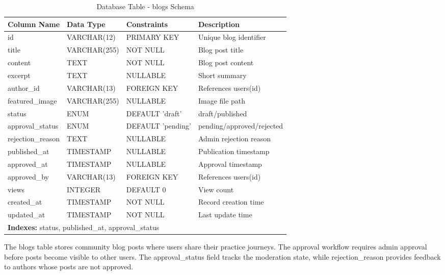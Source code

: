 \documentclass[12pt,a4paper]{report}
\newcommand{\JustifiedNormal}{\fontsize{12}{14}\selectfont\justifying\setlength{\parindent}{0pt}}
\begin{document}
\begin{table}[H]
\centering
\caption{Database Table - blogs Schema}
\small
\begin{tabular}{|p{3.5cm}|p{2.5cm}|p{3.5cm}|p{4cm}|}
\hline
\textbf{Column Name} & \textbf{Data Type} & \textbf{Constraints} & \textbf{Description} \\
\hline
id & VARCHAR(12) & PRIMARY KEY & Unique blog identifier \\
\hline
title & VARCHAR(255) & NOT NULL & Blog post title \\
\hline
content & TEXT & NOT NULL & Blog post content \\
\hline
excerpt & TEXT & NULLABLE & Short summary \\
\hline
author\_id & VARCHAR(13) & FOREIGN KEY & References users(id) \\
\hline
featured\_image & VARCHAR(255) & NULLABLE & Image file path \\
\hline
status & ENUM & DEFAULT 'draft' & draft/published \\
\hline
approval\_status & ENUM & DEFAULT 'pending' & pending/approved/rejected \\
\hline
rejection\_reason & TEXT & NULLABLE & Admin rejection reason \\
\hline
published\_at & TIMESTAMP & NULLABLE & Publication timestamp \\
\hline
approved\_at & TIMESTAMP & NULLABLE & Approval timestamp \\
\hline
approved\_by & VARCHAR(13) & FOREIGN KEY & References users(id) \\
\hline
views & INTEGER & DEFAULT 0 & View count \\
\hline
created\_at & TIMESTAMP & NOT NULL & Record creation time \\
\hline
updated\_at & TIMESTAMP & NOT NULL & Last update time \\
\hline
\multicolumn{4}{|l|}{\textbf{Indexes:} status, published\_at, approval\_status} \\
\hline
\end{tabular}
\end{table}

\JustifiedNormal
The blogs table stores community blog posts where users share their practice journeys. The approval workflow requires admin approval before posts become visible to other users. The approval\_status field tracks the moderation state, while rejection\_reason provides feedback to authors whose posts are not approved.
\end{document}
